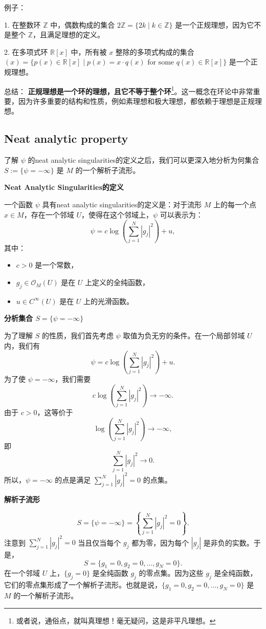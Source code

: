 \documentclass[lang=cn,12pt,a4paper,fontset=none]{beautybook}
\begin{document}
例子：

1. 在整数环 $\mathbb{Z}$ 中，偶数构成的集合 $2\mathbb{Z} = \{2k \mid k \in \mathbb{Z}\}$ 是一个正规理想，因为它不是整个 $\mathbb{Z}$，且满足理想的定义。

2. 在多项式环 $\mathbb{R}[x]$ 中，所有被 $x$ 整除的多项式构成的集合 $(x) = \{ p(x) \in \mathbb{R}[x] \mid p(x) = x \cdot q(x) \text{ for some } q(x) \in \mathbb{R}[x] \}$ 是一个正规理想。

总结：
\textbf{正规理想是一个环的理想，且它不等于整个环}\footnote{或者说，通俗点，就叫真理想！毫无疑问，这是非平凡理想。}。这一概念在环论中非常重要，因为许多重要的结构和性质，例如素理想和极大理想，都依赖于理想是正规理想。


\subsection{Neat analytic property}

了解 \(\psi\) 的neat analytic singularities的定义之后，我们可以更深入地分析为何集合 \( S := \{ \psi = -\infty \} \) 是 \( M \) 的一个解析子流形。

\textbf{Neat Analytic Singularities的定义}

一个函数 \(\psi\) 具有neat analytic singularities的定义是：对于流形 \(M\) 上的每一个点 \(x \in M\)，存在一个邻域 \(U\)，使得在这个邻域上，\(\psi\) 可以表示为：
\[
\psi = c \log \left( \sum_{j=1}^N |g_j|^2 \right) + u,
\]
其中：
\begin{itemize}
  \item \(c > 0\) 是一个常数，
  \item \(g_j \in \mathcal{O}_M(U)\) 是在 \(U\) 上定义的全纯函数，
  \item \(u \in C^\infty(U)\) 是在 \(U\) 上的光滑函数。
\end{itemize}

\textbf{分析集合 \( S = \{ \psi = -\infty \} \)}

为了理解 \( S \) 的性质，我们首先考虑 \(\psi\) 取值为负无穷的条件。在一个局部邻域 \(U\) 内，我们有
\[
\psi = c \log \left( \sum_{j=1}^N |g_j|^2 \right) + u.
\]
为了使 \(\psi = -\infty\)，我们需要
\[
c \log \left( \sum_{j=1}^N |g_j|^2 \right) \to -\infty.
\]
由于 \(c > 0\)，这等价于
\[
\log \left( \sum_{j=1}^N |g_j|^2 \right) \to -\infty,
\]
即
\[
\sum_{j=1}^N |g_j|^2 \to 0.
\]
所以，\(\psi = -\infty\) 的点是满足 \( \sum_{j=1}^N |g_j|^2 = 0 \) 的点集。

\textbf{解析子流形}

\[
S = \{ \psi = -\infty \} = \left\{ \sum_{j=1}^N |g_j|^2 = 0 \right\}.
\]
注意到 \(\sum_{j=1}^N |g_j|^2 = 0\) 当且仅当每个 \(g_j\) 都为零，因为每个 \(|g_j|\) 是非负的实数。于是，
\[
S = \{ g_1 = 0, g_2 = 0, \ldots, g_N = 0 \}.
\]
在一个邻域 \(U\) 上，\(\{g_j = 0\}\) 是全纯函数 \(g_j\) 的零点集。因为这些 \(g_j\) 是全纯函数，它们的零点集形成了一个解析子流形。也就是说，\(\{g_1 = 0, g_2 = 0, \ldots, g_N = 0\}\) 是 \(M\) 的一个解析子流形。
\end{document}
